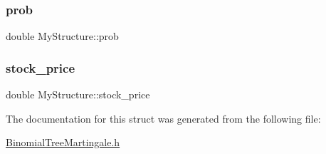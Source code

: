 \hypertarget{structMyStructure_a113b8bdb72511c26fa67c641f0429968}{}\label{structMyStructure_a113b8bdb72511c26fa67c641f0429968} 
\subsubsection{\texorpdfstring{prob}{prob}}
{\footnotesize\ttfamily double My\+Structure\+::prob}

\hypertarget{structMyStructure_a584b01f4a2293b3e8fcb95578a81440f}{}\label{structMyStructure_a584b01f4a2293b3e8fcb95578a81440f} 
\subsubsection{\texorpdfstring{stock\+\_\+price}{stock\_price}}
{\footnotesize\ttfamily double My\+Structure\+::stock\+\_\+price}



The documentation for this struct was generated from the following file\+:\begin{DoxyCompactItemize}
\item 
\hyperlink{BinomialTreeMartingale_8h}{Binomial\+Tree\+Martingale.\+h}\end{DoxyCompactItemize}

